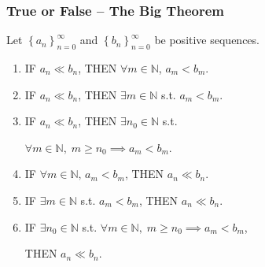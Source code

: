 \documentclass[14pt]{beamer}
\begin{document}
\begin{frame}[t]
	\fontsize{13}{13}\selectfont
	\frametitle{True or False -- The Big Theorem}

	Let $\displaystyle \left\{ a_{n} \right\}_{n=0}^{\infty}$ and $\displaystyle \left
	\{ b_{n} \right\}_{n=0}^{\infty}$ be positive sequences.
	\vspace{.15cm}
	\begin{enumerate}
		\item IF \; {\color{red} $\displaystyle a_{n}\ll b_{n}$}, \quad THEN \;
			{\color{blue} $\displaystyle \forall m \in \mathbb{N}$, $\displaystyle a_{m}< b_{m}$}.
			\vfill

		\item IF \; {\color{red} $\displaystyle a_{n}\ll b_{n}$}, \quad THEN \;
			{\color{blue} $\displaystyle \exists m \in \mathbb{N}$ s.t. $\displaystyle a_{m}< b_{m}$}.
			\vfill

		\item IF \; {\color{red} $\displaystyle a_{n}\ll b_{n}$}, \quad THEN \;
			{\color{blue} $\displaystyle \exists n_{0}\in \mathbb{N}$ s.t.}
			\vspace{.15cm}

			{\color{blue} $\displaystyle \forall m \in \mathbb{N}, \; m\geq n_{0}\implies a_{m}< b_{m}$}.
			\vfill

		\item IF \; {\color{blue} $\displaystyle \forall m \in \mathbb{N}, \, a_{m}< b_{m}$},
			\quad THEN \; {\color{red} $\displaystyle a_{n}\ll b_{n}$}.
			\vfill

		\item IF \; {\color{blue} $\displaystyle \exists m \in \mathbb{N}$ s.t. $\displaystyle a_{m}< b_{m}$},
			\quad THEN \; {\color{red} $\displaystyle a_{n}\ll b_{n}$}.
			\vfill

		\item IF \; {\color{blue} $\displaystyle \exists n_{0}\in \mathbb{N}$ s.t. $\displaystyle \forall m \in \mathbb{N}, \; m\geq n_{0}\implies a_{m}< b_{m}$},
			\vspace{.15cm}

			THEN \; {\color{red} $\displaystyle a_{n}\ll b_{n}$}.
			\vfill
	\end{enumerate}
\end{frame}
\end{document}
